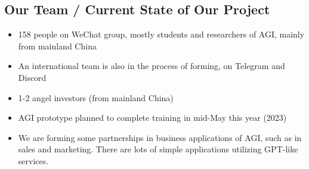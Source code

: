 \begin{preview}
\begin{minipage}{\textwidth}
	\setlength{\parskip}{0.4\baselineskip}

\section{Our Team / Current State of Our Project}

\begin{itemize}
	\item 158 people on WeChat group, mostly students and researchers of AGI, mainly from mainland China
	
	\item An international team is also in the process of forming, on Telegram and Discord
	
	\item 1-2 angel investors (from mainland China)

	\item AGI prototype planned to complete training in mid-May this year (2023)

	\item We are forming some partnerships in business applications of AGI, such as in sales and marketing.  There are lots of simple applications utilizing GPT-like services.
\end{itemize}

\end{minipage}
\end{preview}

